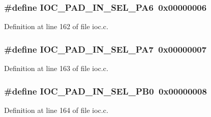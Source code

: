\subsubsection[{\texorpdfstring{I\+O\+C\+\_\+\+P\+A\+D\+\_\+\+I\+N\+\_\+\+S\+E\+L\+\_\+\+P\+A6}{IOC_PAD_IN_SEL_PA6}}]{\setlength{\rightskip}{0pt plus 5cm}\#define I\+O\+C\+\_\+\+P\+A\+D\+\_\+\+I\+N\+\_\+\+S\+E\+L\+\_\+\+P\+A6~0x00000006}\hypertarget{group__ioc__api_ga8247866d92f87bc990dc2c2cd337f2d7}{}\label{group__ioc__api_ga8247866d92f87bc990dc2c2cd337f2d7}


Definition at line 162 of file ioc.\+c.

\subsubsection[{\texorpdfstring{I\+O\+C\+\_\+\+P\+A\+D\+\_\+\+I\+N\+\_\+\+S\+E\+L\+\_\+\+P\+A7}{IOC_PAD_IN_SEL_PA7}}]{\setlength{\rightskip}{0pt plus 5cm}\#define I\+O\+C\+\_\+\+P\+A\+D\+\_\+\+I\+N\+\_\+\+S\+E\+L\+\_\+\+P\+A7~0x00000007}\hypertarget{group__ioc__api_gae34cb0f278f10c14cac791068d2827fc}{}\label{group__ioc__api_gae34cb0f278f10c14cac791068d2827fc}


Definition at line 163 of file ioc.\+c.

\subsubsection[{\texorpdfstring{I\+O\+C\+\_\+\+P\+A\+D\+\_\+\+I\+N\+\_\+\+S\+E\+L\+\_\+\+P\+B0}{IOC_PAD_IN_SEL_PB0}}]{\setlength{\rightskip}{0pt plus 5cm}\#define I\+O\+C\+\_\+\+P\+A\+D\+\_\+\+I\+N\+\_\+\+S\+E\+L\+\_\+\+P\+B0~0x00000008}\hypertarget{group__ioc__api_ga761489be970351c35f64d5016a94c32a}{}\label{group__ioc__api_ga761489be970351c35f64d5016a94c32a}


Definition at line 164 of file ioc.\+c.

